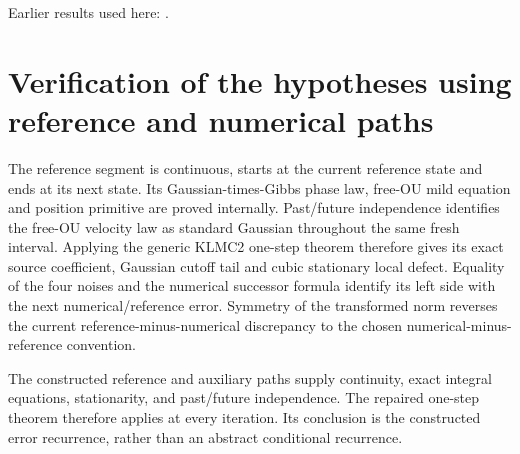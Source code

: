 \documentclass[11pt,a4paper]{article}
\begin{document}
Earlier results used here: \cite[Section~3.17.1]{LangevinLean2026ULASC}.

\section{\texorpdfstring{Verification of the hypotheses using reference and numerical paths}{Verification of the hypotheses using reference and numerical paths}}


The reference segment is continuous, starts at the current reference state and ends at its next state. Its Gaussian-times-Gibbs phase law, free-OU mild equation and position primitive are proved internally. Past/\allowbreak{}future independence identifies the free-OU velocity law as standard Gaussian throughout the same fresh interval. Applying the generic KLMC2 one-step theorem therefore gives its exact source coefficient, Gaussian cutoff tail and cubic stationary local defect. Equality of the four noises and the numerical successor formula identify its left side with the next numerical/\allowbreak{}reference error. Symmetry of the transformed norm reverses the current reference-minus-numerical discrepancy to the chosen numerical-minus-reference convention.



The constructed reference and auxiliary paths supply continuity, exact integral equations, stationarity, and past/\allowbreak{}future independence. The repaired one-step theorem therefore applies at every iteration. Its conclusion is the constructed error recurrence, rather than an abstract conditional recurrence.
\end{document}
